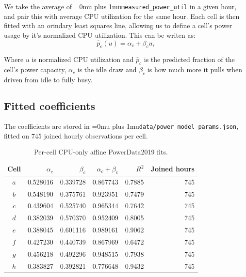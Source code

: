 \documentclass[conference]{IEEEtran}
\newcommand{\codepath}[1]{{\Urlmuskip=0mu plus 1mu\relax\nolinkurl{#1}}}
\begin{document}
We take the average of \codepath{measured_power_util} in a given hour, and pair this with average CPU utilization for the same hour. Each cell is then fitted with an orindary least squares line, allowing us to define a cell's power usage by it's normalized CPU utilization. This can be writen as:
\begin{equation}
  \widehat{p}_{c}(u)
  =
  \alpha_c + \beta_c u,
  \label{eq:powerdata-affine-fit}
\end{equation}

Where \(u\) is normalized CPU utilization and \(\widehat{p}_c\) is the predicted fraction of the cell's power capacity, \(\alpha_c\) is the idle draw and \(\beta_c\) is how much more it pulls when driven from idle to fully busy. 

\subsection{Fitted coefficients}
\label{subsec:powerdata-coefficients}

The coefficients are stored in \codepath{data/power_model_params.json}, fitted on 745 joined hourly observations per cell.

\begin{table}[htbp]
  \centering
  \footnotesize
  \caption{Per-cell CPU-only affine PowerData2019 fits.}
  \label{tab:powerdata-coefficients}
  \begin{tabular}{@{}crrrrr@{}}
    \toprule
    Cell & \(\alpha_c\) & \(\beta_c\) & \(\alpha_c+\beta_c\)
         & \(R^2\) & Joined hours \\
    \midrule
    \(a\) & 0.528016 & 0.339728 & 0.867743 & 0.7885 & 745 \\
    \(b\) & 0.548190 & 0.375761 & 0.923951 & 0.7479 & 745 \\
    \(c\) & 0.439604 & 0.525740 & 0.965344 & 0.7642 & 745 \\
    \(d\) & 0.382039 & 0.570370 & 0.952409 & 0.8005 & 745 \\
    \(e\) & 0.388045 & 0.601116 & 0.989161 & 0.9062 & 745 \\
    \(f\) & 0.427230 & 0.440739 & 0.867969 & 0.6472 & 745 \\
    \(g\) & 0.456218 & 0.492296 & 0.948515 & 0.7938 & 745 \\
    \(h\) & 0.383827 & 0.392821 & 0.776648 & 0.9432 & 745 \\
    \bottomrule
  \end{tabular}
\end{table}
\end{document}
